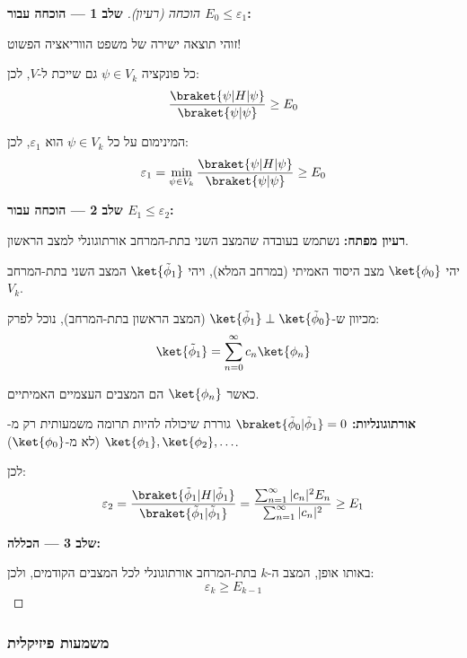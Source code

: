 \begin{proof}[הוכחה (רעיון)]
\textbf{שלב 1 — הוכחה עבור $E_0 \leq \varepsilon_1$:}

זוהי תוצאה ישירה של משפט הווריאציה הפשוט!

כל פונקציה $\psi \in V_k$ גם שייכת ל-$V$, לכן:
\[
\frac{\braket{\psi|H|\psi}}{\braket{\psi|\psi}} \geq E_0
\]

המינימום על כל $\psi \in V_k$ הוא $\varepsilon_1$, לכן:
\[
\varepsilon_1 = \min_{\psi \in V_k} \frac{\braket{\psi|H|\psi}}{\braket{\psi|\psi}} \geq E_0
\]

\textbf{שלב 2 — הוכחה עבור $E_1 \leq \varepsilon_2$:}

\textbf{רעיון מפתח:} נשתמש בעובדה שהמצב השני בתת-המרחב אורתוגונלי למצב הראשון.

יהי $\ket{\phi_0}$ מצב היסוד האמיתי (במרחב המלא), ויהי $\ket{\tilde{\phi}_1}$ המצב השני בתת-המרחב $V_k$.

מכיוון ש-$\ket{\tilde{\phi}_1} \perp \ket{\tilde{\phi}_0}$ (המצב הראשון בתת-המרחב), נוכל לפרק:
\[
\ket{\tilde{\phi}_1} = \sum_{n=0}^{\infty} c_n \ket{\phi_n}
\]

כאשר $\ket{\phi_n}$ הם המצבים העצמיים האמיתיים.

\textbf{אורתוגונליות:} $\braket{\tilde{\phi}_0|\tilde{\phi}_1} = 0$ גוררת שיכולה להיות תרומה משמעותית רק מ-$\ket{\phi_1}, \ket{\phi_2}, \ldots$ (לא מ-$\ket{\phi_0}$).

לכן:
\[
\varepsilon_2 = \frac{\braket{\tilde{\phi}_1|H|\tilde{\phi}_1}}{\braket{\tilde{\phi}_1|\tilde{\phi}_1}} = \frac{\sum_{n=1}^{\infty} |c_n|^2 E_n}{\sum_{n=1}^{\infty} |c_n|^2} \geq E_1
\]

\textbf{שלב 3 — הכללה:}

באותו אופן, המצב ה-$k$ בתת-המרחב אורתוגונלי לכל המצבים הקודמים, ולכן:
\[
\varepsilon_k \geq E_{k-1}
\]
\end{proof}

\subsubsection*{משמעות פיזיקלית}

